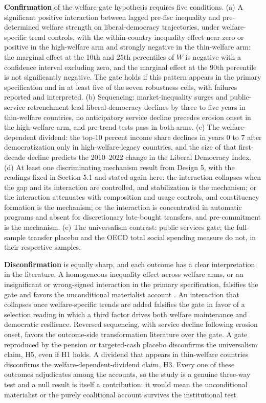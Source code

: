 \documentclass[11pt,letterpaper]{article}
\begin{document}
\textbf{Confirmation} of the welfare-gate hypothesis requires five conditions. (a) A significant positive interaction between lagged pre-fisc inequality and pre-determined welfare strength on liberal-democracy trajectories, under welfare-specific trend controls, with the within-country inequality effect near zero or positive in the high-welfare arm and strongly negative in the thin-welfare arm: the marginal effect at the 10th and 25th percentiles of $W$ is negative with a confidence interval excluding zero, and the marginal effect at the 90th percentile is not significantly negative. The gate holds if this pattern appears in the primary specification and in at least five of the seven robustness cells, with failures reported and interpreted. (b) Sequencing: market-inequality surges and public-service retrenchment lead liberal-democracy declines by three to five years in thin-welfare countries, no anticipatory service decline precedes erosion onset in the high-welfare arm, and pre-trend tests pass in both arms. (c) The welfare-dependent dividend: the top-10 percent income share declines in years 0 to 7 after democratization only in high-welfare-legacy countries, and the size of that first-decade decline predicts the 2010--2022 change in the Liberal Democracy Index. (d) At least one discriminating mechanism result from Design 5, with the readings fixed in Section 5.1 and stated again here: the interaction collapses when the gap and its interaction are controlled, and stabilization is the mechanism; or the interaction attenuates with composition and usage controls, and constituency formation is the mechanism; or the interaction is concentrated in automatic programs and absent for discretionary late-bought transfers, and pre-commitment is the mechanism. (e) The universalism contrast: public services gate; the full-sample transfer placebo and the OECD total social spending measure do not, in their respective samples.

\textbf{Disconfirmation} is equally sharp, and each outcome has a clear interpretation in the literature. A homogeneous inequality effect across welfare arms, or an insignificant or wrong-signed interaction in the primary specification, falsifies the gate and favors the unconditional materialist account \citep{RauStokes2025, Houle2009}. An interaction that collapses once welfare-specific trends are added falsifies the gate in favor of a selection reading in which a third factor drives both welfare maintenance and democratic resilience. Reversed sequencing, with service decline following erosion onset, favors the outcome-side transformation literature \citep{SzikraOktem2023, LendvaiBainton2021, Vanhuysse2006, Benczes2024} over the gate. A gate reproduced by the pension or targeted-cash placebo disconfirms the universalism claim, H5, even if H1 holds. A dividend that appears in thin-welfare countries disconfirms the welfare-dependent-dividend claim, H3. Every one of these outcomes adjudicates among the accounts, so the study is a genuine three-way test and a null result is itself a contribution: it would mean the unconditional materialist or the purely coalitional account survives the institutional test.
\end{document}
